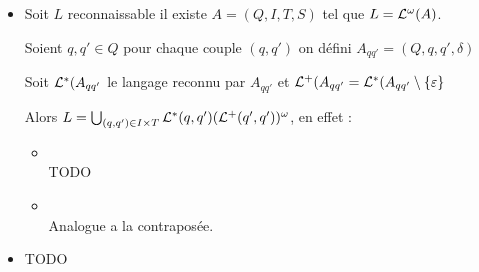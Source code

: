 \begin{proofI}
	\begin{itemize}
		\item \bimpRL

		      Soit $L$ reconnaissable il existe $A = (Q,I,T,S)$ tel que $L = \mathcal{L}^{\omega}(A)$.

		      Soient $q,q' \in Q$ pour chaque couple $(q,q')$ on défini $A_{qq'} = (Q,q,q',\delta)$

		      Soit $\mathcal{L}^*(A_{qq'}$ le langage reconnu par $A_{qq'}$ et $\mathcal{L}^+(A_{qq'} = \mathcal{L}^*(A_{qq'} \setminus \left\{\varepsilon\right\}$


		      Alors $L = \bigcup_{(q,q') \in I \times T} \mathcal{L}^*(q,q')(\mathcal{L}^+(q',q'))^{\omega}$, en effet :

		      \begin{itemize}
			      \item \fbox{$\supseteq$} \\
			            TODO

			      \item \fbox{$\subseteq$} \\
			            Analogue a la contraposée.
		      \end{itemize}


		\item \bimpLR
            TODO
	\end{itemize}
\end{proofI}
